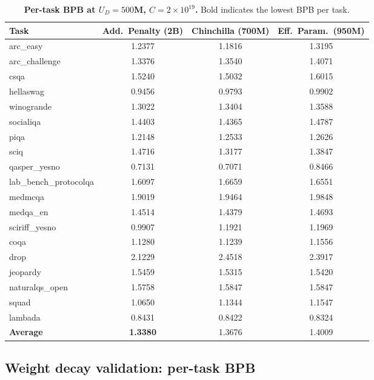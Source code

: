 \begin{table}[t]
    \centering
    \caption{\textbf{Per-task BPB at $U_D = 500$M, $C = 2 \times 10^{19}$.} Bold indicates the lowest BPB per task.}
    \label{tab:task_bpb_500m_2e19}
    \small
    \begin{tabular}{lccc}
        \toprule
        Task & Add.\ Penalty (2B) & Chinchilla (700M) & Eff.\ Param.\ (950M) \\
        \midrule
        arc\_easy & 1.2377 & {1.1816} & 1.3195 \\
        arc\_challenge & {1.3376} & 1.3540 & 1.4071 \\
        csqa & 1.5240 & {1.5032} & 1.6015 \\
        hellaswag & {0.9456} & 0.9793 & 0.9902 \\
        winogrande & {1.3022} & 1.3404 & 1.3588 \\
        socialiqa & 1.4403 & {1.4365} & 1.4787 \\
        piqa & {1.2148} & 1.2533 & 1.2626 \\
        sciq & 1.4716 & {1.3177} & 1.3847 \\
        qasper\_yesno & 0.7131 & {0.7071} & 0.8466 \\
        lab\_bench\_protocolqa & {1.6097} & 1.6659 & 1.6551 \\
        medmcqa & {1.9019} & 1.9464 & 1.9848 \\
        medqa\_en & 1.4514 & {1.4379} & 1.4693 \\
        sciriff\_yesno & {0.9907} & 1.1921 & 1.1969 \\
        \midrule
        coqa & 1.1280 & {1.1239} & 1.1556 \\
        drop & {2.1229} & 2.4518 & 2.3917 \\
        jeopardy & 1.5459 & {1.5315} & 1.5420 \\
        naturalqs\_open & {1.5758} & 1.5847 & 1.5847 \\
        squad & {1.0650} & 1.1344 & 1.1547 \\
        \midrule
        lambada & 0.8431 & {0.8422} & {0.8324} \\
        \midrule
        \textbf{Average} & \textbf{1.3380} & 1.3676 & 1.4009 \\
        \bottomrule
    \end{tabular}
\end{table}

\subsection{Weight decay validation: per-task BPB}

